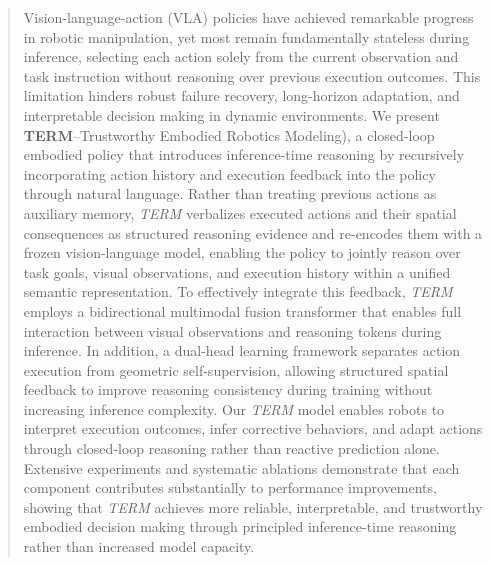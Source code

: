 \documentclass[letterpaper]{article} %
\begin{document}
\begin{abstract}
Vision-language-action (VLA) policies have achieved remarkable progress in robotic manipulation, yet most remain fundamentally stateless during inference, selecting each action solely from the current observation and task instruction without reasoning over previous execution outcomes. This limitation hinders robust failure recovery, long-horizon adaptation, and interpretable decision making in dynamic environments. We present \textbf{TERM}--Trustworthy Embodied Robotics Modeling), a closed-loop embodied policy that introduces inference-time reasoning by recursively incorporating action history and execution feedback into the policy through natural language. Rather than treating previous actions as auxiliary memory, \textit{TERM} verbalizes executed actions and their spatial consequences as structured reasoning evidence and re-encodes them with a frozen vision-language model, enabling the policy to jointly reason over task goals, visual observations, and execution history within a unified semantic representation. To effectively integrate this feedback, \textit{TERM} employs a bidirectional multimodal fusion transformer that enables full interaction between visual observations and reasoning tokens during inference. In addition, a dual-head learning framework separates action execution from geometric self-supervision, allowing structured spatial feedback to improve reasoning consistency during training without increasing inference complexity. Our \textit{TERM} model enables robots to interpret execution outcomes, infer corrective behaviors, and adapt actions through closed-loop reasoning rather than reactive prediction alone. Extensive experiments and systematic ablations demonstrate that each component contributes substantially to performance improvements, showing that \textit{TERM} achieves more reliable, interpretable, and trustworthy embodied decision making through principled inference-time reasoning rather than increased model capacity.



\end{abstract}

\end{document}
